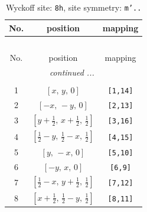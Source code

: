 \documentclass[fleqn,8pt]{jsarticle}
\begin{document}
\begin{longtable}{ccc}
\caption{Wyckoff site: {\tt 8h}, site symmetry: {\tt m'..}}
 \\
 \hline \hline
No. & position & mapping \\ \hline \endfirsthead

\multicolumn{2}{l}{\tablename\ \thetable{}} \\
 \hline \hline
No. & position & mapping \\ \hline \endhead

 \hline \hline
\multicolumn{2}{r}{\footnotesize\it continued ...} \\ \endfoot

 \hline \hline
\multicolumn{2}{r}{} \\ \endlastfoot

1 & $\left[ x,\, y,\, 0 \right]$ & {\tt [1,14]} \\ \hline
2 & $\left[ - x,\, - y,\, 0 \right]$ & {\tt [2,13]} \\ \hline
3 & $\left[ y + \frac{1}{2},\, x + \frac{1}{2},\, \frac{1}{2} \right]$ & {\tt [3,16]} \\ \hline
4 & $\left[ \frac{1}{2} - y,\, \frac{1}{2} - x,\, \frac{1}{2} \right]$ & {\tt [4,15]} \\ \hline
5 & $\left[ y,\, - x,\, 0 \right]$ & {\tt [5,10]} \\ \hline
6 & $\left[ - y,\, x,\, 0 \right]$ & {\tt [6,9]} \\ \hline
7 & $\left[ \frac{1}{2} - x,\, y + \frac{1}{2},\, \frac{1}{2} \right]$ & {\tt [7,12]} \\ \hline
8 & $\left[ x + \frac{1}{2},\, \frac{1}{2} - y,\, \frac{1}{2} \right]$ & {\tt [8,11]} \\
\end{longtable}
\renewcommand{\arraystretch}{1.2}
\end{document}
